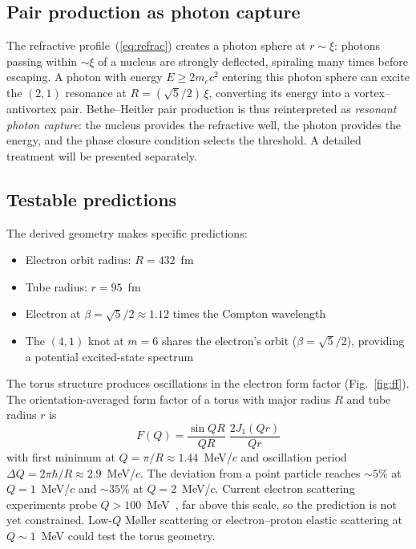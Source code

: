 \documentclass[11pt,a4paper]{article}
\begin{document}
\subsection{Pair production as photon capture}

The refractive profile~(\ref{eq:refrac}) creates a photon sphere at
$r \sim \xi$: photons passing within $\sim\!\xi$ of a nucleus are
strongly deflected, spiraling many times before escaping.  A photon
with energy $E \geq 2m_e c^2$ entering this photon sphere can excite
the $(2,1)$ resonance at $R = (\sqrt{5}/2)\,\xi$, converting its
energy into a vortex--antivortex pair.  Bethe--Heitler pair production
is thus reinterpreted as \emph{resonant photon capture}: the nucleus
provides the refractive well, the photon provides the energy, and the
phase closure condition selects the threshold.  A detailed treatment
will be presented separately.

\subsection{Testable predictions}

The derived geometry makes specific predictions:
\begin{itemize}
  \item Electron orbit radius: $R = 432$~fm
  \item Tube radius: $r = 95$~fm
  \item Electron at $\beta = \sqrt{5}/2 \approx 1.12$ times the
    Compton wavelength
  \item The $(4,1)$ knot at $m = 6$ shares the electron's orbit
    ($\beta = \sqrt{5}/2$), providing a potential excited-state
    spectrum
\end{itemize}
The torus structure produces oscillations in the electron form
factor (Fig.~\ref{fig:ff}).  The orientation-averaged form factor of
a torus with major radius $R$ and tube radius $r$ is
\begin{equation}
  F(Q) = \frac{\sin QR}{QR}\;\frac{2J_1(Qr)}{Qr}
  \label{eq:ff}
\end{equation}
with first minimum at $Q = \pi/R \approx 1.44$~MeV/$c$ and
oscillation period $\Delta Q = 2\pi\hbar/R \approx 2.9$~MeV/$c$.
The deviation from a point particle reaches $\sim\!5\%$ at
$Q = 1$~MeV/$c$ and $\sim\!35\%$ at $Q = 2$~MeV/$c$.  Current
electron scattering experiments probe $Q > 100$~MeV~\cite{PDG},
far above this scale, so the prediction is not yet constrained.
Low-$Q$ M\o ller scattering or electron--proton elastic scattering
at $Q \sim 1$~MeV could test the torus geometry.
\end{document}
